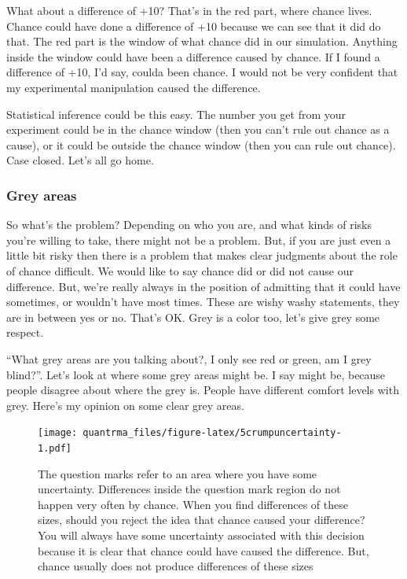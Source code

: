 \documentclass[
]{book}
\begin{document}
What about a difference of +10? That's in the red part, where chance lives. Chance could have done a difference of +10 because we can see that it did do that. The red part is the window of what chance did in our simulation. Anything inside the window could have been a difference caused by chance. If I found a difference of +10, I'd say, coulda been chance. I would not be very confident that my experimental manipulation caused the difference.

Statistical inference could be this easy. The number you get from your experiment could be in the chance window (then you can't rule out chance as a cause), or it could be outside the chance window (then you can rule out chance). Case closed. Let's all go home.

\hypertarget{grey-areas}{%
\subsubsection{Grey areas}\label{grey-areas}}

So what's the problem? Depending on who you are, and what kinds of risks you're willing to take, there might not be a problem. But, if you are just even a little bit risky then there is a problem that makes clear judgments about the role of chance difficult. We would like to say chance did or did not cause our difference. But, we're really always in the position of admitting that it could have sometimes, or wouldn't have most times. These are wishy washy statements, they are in between yes or no. That's OK. Grey is a color too, let's give grey some respect.

``What grey areas are you talking about?, I only see red or green, am I grey blind?''. Let's look at where some grey areas might be. I say might be, because people disagree about where the grey is. People have different comfort levels with grey. Here's my opinion on some clear grey areas.

\begin{figure}
\centering
\texttt{[image: quantrma\_files/figure-latex/5crumpuncertainty-1.pdf]}
\caption{\label{fig:5crumpuncertainty}The question marks refer to an area where you have some uncertainty. Differences inside the question mark region do not happen very often by chance. When you find differences of these sizes, should you reject the idea that chance caused your difference? You will always have some uncertainty associated with this decision because it is clear that chance could have caused the difference. But, chance usually does not produce differences of these sizes}
\end{figure}
\end{document}
